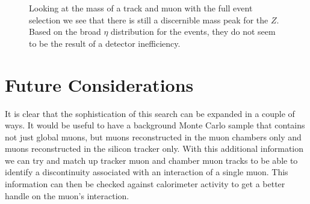 \documentclass[a4paper,12pt]{article}
\begin{document}
    \begin{figure}[!htbp]%
        \centering
        \caption{Looking at the mass of a track and muon with the full event
        selection we see that there is still a discernible mass peak for the
        $Z$. Based on the broad $\eta$ distribution for the events, they do
        not seem to be the result of a detector inefficiency.}
        \label{fig:six}
    \end{figure}


\section{Future Considerations}

    It is clear that the sophistication of this search can be expanded in a
    couple of  ways. It would be useful to have a background Monte Carlo sample
    that contains not just global muons, but muons reconstructed in the muon
    chambers only and muons reconstructed in the silicon tracker only. With this
    additional information we can try and match up tracker muon and chamber muon
    tracks to be able to identify a discontinuity associated with an interaction
    of a single muon. This information can then be checked against calorimeter
    activity to get a better handle on the muon's interaction.
\end{document}
